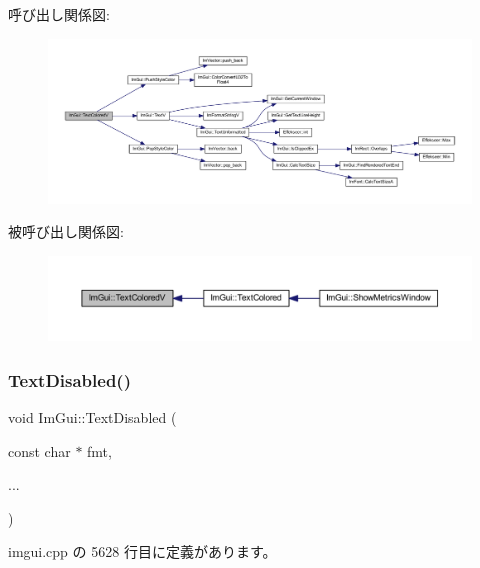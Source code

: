 呼び出し関係図\+:\nopagebreak
\begin{figure}[H]
\begin{center}
\leavevmode
\includegraphics[width=350pt]{namespace_im_gui_a87c24ece994188a7145d8feecb4439ed_cgraph}
\end{center}
\end{figure}
被呼び出し関係図\+:\nopagebreak
\begin{figure}[H]
\begin{center}
\leavevmode
\includegraphics[width=350pt]{namespace_im_gui_a87c24ece994188a7145d8feecb4439ed_icgraph}
\end{center}
\end{figure}
\mbox{\label{namespace_im_gui_aa96bf14c5fa288e106820aeb4ba7fcb6}} 
\subsubsection{\texorpdfstring{Text\+Disabled()}{TextDisabled()}}
{\footnotesize\ttfamily void Im\+Gui\+::\+Text\+Disabled (\begin{DoxyParamCaption}\item[{const char $\ast$}]{fmt,  }\item[{}]{... }\end{DoxyParamCaption})}



 imgui.\+cpp の 5628 行目に定義があります。

